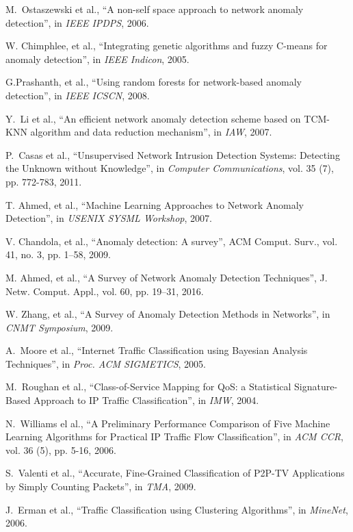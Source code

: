 \documentclass[10pt, conference, letterpaper]{IEEEtran}
\begin{document}
\begin{thebibliography}{99}
M.~Ostaszewski et al., ``A non-self space approach to network anomaly detection'', in \emph{IEEE IPDPS}, 2006.

{W. Chimphlee, et al.}, ``{Integrating genetic algorithms and fuzzy C-means for anomaly detection}'', in \emph{IEEE Indicon}, 2005.

{G.Prashanth, et al.}, ``Using random forests for network-based anomaly detection'', in \emph{IEEE ICSCN}, 2008.

Y.~Li et al., ``{An efficient network anomaly detection scheme based on TCM-KNN algorithm and data reduction mechanism}'', in \emph{IAW}, 2007.

P.~Casas et al., ``Unsupervised Network Intrusion Detection Systems: Detecting the Unknown without Knowledge'', in \emph{Computer Communications}, vol. 35 (7), pp. 772-783, 2011.

T. Ahmed, et al., ``Machine Learning Approaches to Network Anomaly Detection'', in \emph{USENIX SYSML Workshop}, 2007.

V. Chandola, et al., ``Anomaly detection: A survey'', ACM Comput. Surv., vol. 41, no. 3, pp. 1--58, 2009.

M. Ahmed, et al., ``A Survey of Network Anomaly Detection Techniques'', J. Netw. Comput. Appl., vol. 60, pp. 19--31, 2016.

W. Zhang, et al., ``A Survey of Anomaly Detection Methods in Networks'', in \emph{CNMT Symposium}, 2009.

A.~Moore et al., ``Internet Traffic Classification using Bayesian Analysis Techniques'', in \emph{Proc. ACM SIGMETICS}, 2005.

M.~Roughan et al., ``Class-of-Service Mapping for QoS: a Statistical Signature-Based Approach to IP Traffic Classification'', in \emph{IMW}, 2004.

N.~Williams el al., ``A Preliminary Performance Comparison of Five Machine Learning Algorithms for Practical IP Traffic Flow Classification'', in \emph{ACM CCR}, vol. 36 (5), pp. 5-16, 2006.

S.~Valenti et al., ``Accurate, Fine-Grained Classification of P2P-TV Applications by Simply Counting Packets'', in \emph{TMA}, 2009.

J.~Erman et al., ``Traffic Classification using Clustering Algorithms'', in \emph{MineNet}, 2006.


\end{thebibliography}
\end{document}
